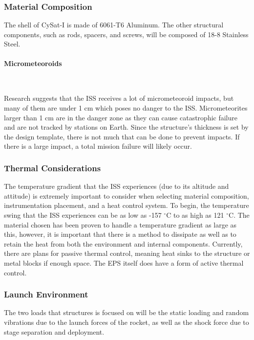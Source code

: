 \documentclass[12pt]{article}
\begin{document}
\subsubsection{Material Composition}

The shell of CySat-I is made of 6061-T6 Aluminum. The other structural components, such as rods, spacers, and screws, will be composed of 18-8 Stainless Steel.

\paragraph{Micrometeoroids} \

Research suggests that the ISS receives a lot of micrometeoroid impacts, but many of them are under 1 \si{\centi\meter} which poses no danger to the ISS. Micrometeorites larger than 1 \si{\centi\meter} are in the danger zone as they can cause catastrophic failure and are not tracked by stations on Earth. Since the structure's thickness is set by the design template, there is not much that can be done to prevent impacts. If there is a large impact, a total mission failure will likely occur.

\subsubsection{Thermal Considerations}

The temperature gradient that the ISS experiences (due to its altitude and attitude) is extremely important to consider when selecting material composition, instrumentation placement, and a heat control system. To begin, the temperature swing that the ISS experiences can be as low as -157 $^{\circ}$C to as high as 121 $^{\circ}$C. The material chosen has been proven to handle a temperature gradient as large as this, however, it is important that there is a method to dissipate as well as to retain the heat from both the environment and internal components. Currently, there are plans for passive thermal control, meaning heat sinks to the structure or metal blocks if enough space. The EPS itself does have a form of active thermal control.

\subsubsection{Launch Environment}

The two loads that structures is focused on will be the static loading and random vibrations due to the launch forces of the rocket, as well as the shock force due to stage separation and deployment.
\end{document}
